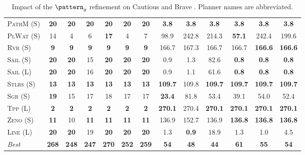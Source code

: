\documentclass[11pt,landscape]{article}
\begin{document}
\begin{table}[tb]
{\begin{tabular}{|l||cccccc||cccccc||}
\textsc{PathM} (S)&\textbf{20}&\textbf{20}&\textbf{20}&\textbf{20}&\textbf{20}&\textbf{20}&\textbf{3.8}&\textbf{3.8}&\textbf{3.8}&\textbf{3.8}&\textbf{3.8}&\textbf{3.8}\\
\textsc{PlWat} (S)&14&4&6&\textbf{17}&4&7&98.9&242.8&214.3&\textbf{57.1}&242.4&199.6\\
\textsc{Rvr} (S)&\textbf{9}&\textbf{9}&\textbf{9}&\textbf{9}&\textbf{9}&\textbf{9}&166.7&167.3&166.7&166.7&\textbf{166.6}&\textbf{166.6}\\
\textsc{Sail} (S)&\textbf{20}&\textbf{20}&15&\textbf{20}&\textbf{20}&\textbf{20}&0.9&1.3&82.6&\textbf{0.8}&\textbf{0.8}&\textbf{0.8}\\
\textsc{Sail} (L)&\textbf{20}&\textbf{20}&16&\textbf{20}&\textbf{20}&\textbf{20}&0.9&1.1&61.6&\textbf{0.8}&\textbf{0.8}&\textbf{0.8}\\
\textsc{Stlrs} (S)&\textbf{13}&\textbf{13}&\textbf{13}&\textbf{13}&\textbf{13}&\textbf{13}&\textbf{109.7}&109.8&\textbf{109.7}&\textbf{109.7}&\textbf{109.7}&\textbf{109.7}\\
\textsc{Sgr} (S)&\textbf{19}&15&17&18&17&17&\textbf{23.4}&81.8&53.4&39.1&54.0&52.4\\
\textsc{Tpp} (L)&\textbf{2}&\textbf{2}&\textbf{2}&\textbf{2}&\textbf{2}&\textbf{2}&\textbf{270.1}&270.4&\textbf{270.1}&\textbf{270.1}&\textbf{270.1}&\textbf{270.1}\\
\textsc{Zeno} (S)&\textbf{11}&10&\textbf{11}&\textbf{11}&\textbf{11}&\textbf{11}&136.9&152.7&136.9&\textbf{136.8}&\textbf{136.8}&\textbf{136.8}\\
\textsc{Line} (L)&\textbf{20}&\textbf{20}&19&\textbf{20}&\textbf{20}&\textbf{20}&1.3&\textbf{0.9}&18.9&1.3&1.0&4.5
\\\hline
\textit{Best}&\textbf{268}&\textbf{248}&\textbf{247}&\textbf{270}&\textbf{252}&\textbf{259}&\textbf{54}&\textbf{48}&\textbf{44}&\textbf{61}&\textbf{55}&\textbf{54}\\\hline

        \end{tabular}}
        \caption{Impact of the $\pattern_g$ refinement on Cautious and Brave \pattyd. Planner names are abbreviated.}
        \label{tab:abl-patterng}
        \end{table}
        
\end{document}
